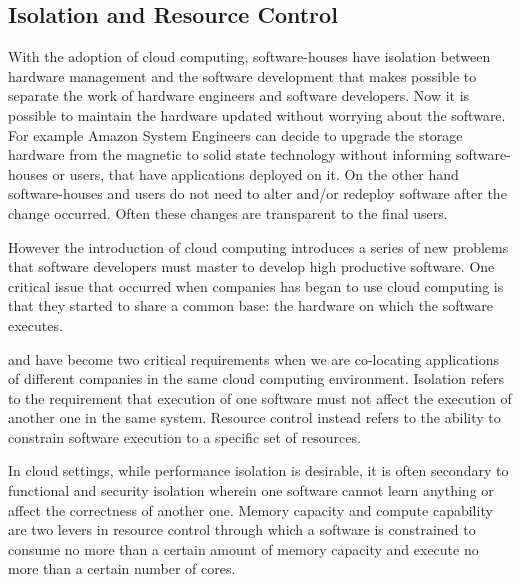 \subsection{Isolation and Resource Control}
\label{sec:background-cloudComputing-isolationResource}
With the adoption of cloud computing, software-houses have isolation between hardware management and the software
development that makes possible to separate the work of hardware engineers and software developers.
Now it is possible to maintain the hardware updated without worrying about the software. For example Amazon
System Engineers can decide to upgrade the storage hardware from the magnetic to solid state technology without
informing software-houses or users, that have applications deployed on it. On the other hand software-houses
and users do not need to alter and/or redeploy software after the change occurred. Often these changes are
transparent to the final users. 

However the introduction of cloud computing introduces a series of new problems that software developers must
master to develop high productive software. One critical issue that occurred when companies has began to use cloud 
computing is that they started to share a common base: the hardware on which the software executes.

 and  have become two critical requirements when we are co-locating
applications of different companies in the same cloud computing environment. Isolation refers to the requirement
that execution of one software must not affect the execution of another one in the same system. Resource control
instead refers to the ability to constrain software execution to a specific set of resources.

In cloud settings, while performance isolation is desirable, it is often secondary to functional and security
isolation wherein one software cannot learn anything or affect the correctness of another one. Memory capacity
and compute capability are two levers in resource control through which a software is constrained to consume
no more than a certain amount of memory capacity and execute no more than a certain number of cores.
